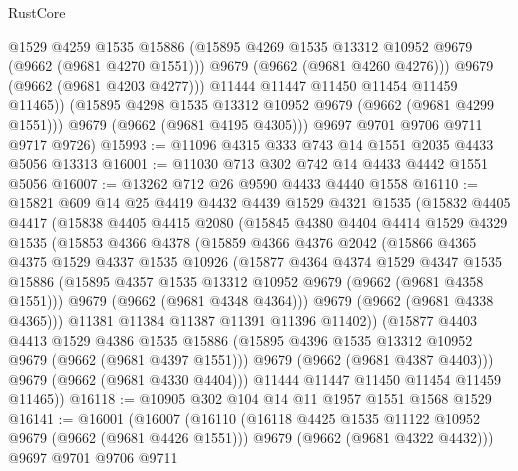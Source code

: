 \begin{lexlean}{RustCore}
\begin{coremodule}
                @1529
                @4259
                @1535
                @15886
                (@15895 @4269 @1535 @13312 @10952 @9679 (@9662 (@9681 @4270 @1551)))
                @9679
                (@9662 (@9681 @4260 @4276)))
              @9679
              (@9662 (@9681 @4203 @4277)))
            @11444
            @11447
            @11450
            @11454
            @11459
            @11465))
        (@15895 @4298 @1535 @13312 @10952 @9679 (@9662 (@9681 @4299 @1551)))
        @9679
        (@9662 (@9681 @4195 @4305)))
      @9697
      @9701
      @9706
      @9711
      @9717
      @9726)
@15993 := @11096 @4315 @333 @743 @14 @1551 @2035 @4433 @5056 @13313
@16001 := @11030 @713 @302 @742 @14 @4433 @4442 @1551 @5056
@16007 := @13262 @712 @26 @9590 @4433 @4440 @1558
@16110 := @15821
    @609
    @14
    @25
    @4419
    @4432
    @4439
    @1529
    @4321
    @1535
    (@15832
      @4405
      @4417
      (@15838
        @4405
        @4415
        @2080
        (@15845
          @4380
          @4404
          @4414
          @1529
          @4329
          @1535
          (@15853
            @4366
            @4378
            (@15859
              @4366
              @4376
              @2042
              (@15866
                @4365
                @4375
                @1529
                @4337
                @1535
                @10926
                (@15877
                  @4364
                  @4374
                  @1529
                  @4347
                  @1535
                  @15886
                  (@15895 @4357 @1535 @13312 @10952 @9679 (@9662 (@9681 @4358 @1551)))
                  @9679
                  (@9662 (@9681 @4348 @4364)))
                @9679
                (@9662 (@9681 @4338 @4365)))
              @11381
              @11384
              @11387
              @11391
              @11396
              @11402))
          (@15877
            @4403
            @4413
            @1529
            @4386
            @1535
            @15886
            (@15895 @4396 @1535 @13312 @10952 @9679 (@9662 (@9681 @4397 @1551)))
            @9679
            (@9662 (@9681 @4387 @4403)))
          @9679
          (@9662 (@9681 @4330 @4404)))
        @11444
        @11447
        @11450
        @11454
        @11459
        @11465))
@16118 := @10905 @302 @104 @14 @11 @1957 @1551 @1568 @1529
@16141 := @16001
    (@16007
      (@16110
        (@16118 @4425 @1535 @11122 @10952 @9679 (@9662 (@9681 @4426 @1551)))
        @9679
        (@9662 (@9681 @4322 @4432)))
      @9697
      @9701
      @9706
      @9711

\end{coremodule}
\end{lexlean}
